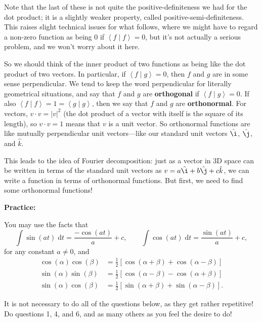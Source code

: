 \documentclass{article}
\newcommand{\ihat}{\hat\i}
\newcommand{\jhat}{\hat\j}
\newcommand{\khat}{\hat{k}}
\newcommand{\diff}{\;\mathrm{d}}
\newcommand{\braket}[2]{\left\langle #1 \mid #2 \right\rangle}
\begin{document}
Note that the last of these is not quite the positive-definiteness we had for the dot product; it is a slightly weaker property, called positive-semi-definiteness. This raises slight technical issues for what follows, where we might have to regard a non-zero function as being 0 if $\braket{f}{f}=0$, but it's not actually a serious problem, and we won't worry about it here.

So we should think of the inner product of two functions as being like the dot product of two vectors. In particular, if $\braket{f}{g}=0$, then $f$ and $g$ are in some sense perpendicular. We tend to keep the word perpendicular for literally geometrical situations, and say that $f$ and $g$ are \textbf{orthogonal} if $\braket{f}{g}=0$. If also $\braket{f}{f}=1=\braket{g}{g}$, then we say that $f$ and $g$ are \textbf{orthonormal}. For vectors, $v\cdot v=|v|^2$ (the dot product of a vector with itself is the square of its length), so $v\cdot v=1$ means that $v$ is a unit vector. So orthonormal functions are like mutually perpendicular unit vectors---like our standard unit vectors $\ihat$, $\jhat$, and $\khat$.

This leads to the idea of Fourier decomposition: just as a vector in 3D space can be written in terms of the standard unit vectors as $v=a\ihat+b\jhat+c\khat$, we can write a function in terms of orthonormal functions. But first, we need to find some orthonormal functions!

\clearpage


\textbf{Practice:}\bigskip


You may use the facts that
\[\int \sin(at)\diff t = \frac{-\cos(at)}{a}+c,\qquad \int \cos(at)\diff t = \frac{\sin(at)}{a}+c,\]
for any constant $a\neq 0$, and
\begin{align*}
	\cos(\alpha)\cos(\beta)&=\frac{1}{2}\left[\cos(\alpha+\beta)+\cos(\alpha-\beta)\right]\\
	\sin(\alpha)\sin(\beta)&=\frac{1}{2}\left[\cos(\alpha-\beta)-\cos(\alpha+\beta)\right]\\
	\sin(\alpha)\cos(\beta)&=\frac{1}{2}\left[\sin(\alpha+\beta)+\sin(\alpha-\beta)\right].
\end{align*}\medskip


It is not necessary to do all of the questions below, as they get rather repetitive! Do questions 1, 4, and 6, and as many others as you feel the desire to do!
\end{document}
